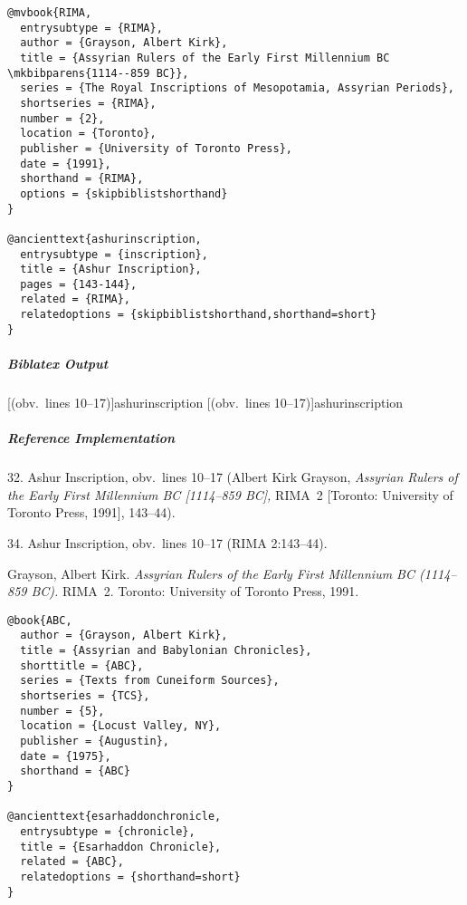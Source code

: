 \documentclass[a4paper]{article}
\newenvironment{biboutput}{%
  \subparagraph{Biblatex Output}
}{\color{black}}
\newenvironment{refimp}{%
  \subparagraph{Reference Implementation}
  \color{reference-colour}
  \rm
}{\par\color{black}}
\begin{document}
\medskip

\begin{lstlisting}
@mvbook{RIMA,
  entrysubtype = {RIMA},
  author = {Grayson, Albert Kirk},
  title = {Assyrian Rulers of the Early First Millennium BC \mkbibparens{1114--859 BC}},
  series = {The Royal Inscriptions of Mesopotamia, Assyrian Periods},
  shortseries = {RIMA},
  number = {2},
  location = {Toronto},
  publisher = {University of Toronto Press},
  date = {1991},
  shorthand = {RIMA},
  options = {skipbiblistshorthand}
}

@ancienttext{ashurinscription,
  entrysubtype = {inscription},
  title = {Ashur Inscription},
  pages = {143-144},
  related = {RIMA},
  relatedoptions = {skipbiblistshorthand,shorthand=short}
}
\end{lstlisting}

\begin{biboutput}
  [(obv.\ lines 10--17)]{ashurinscription}
  [(obv.\ lines 10--17)]{ashurinscription}
\end{biboutput}

\begin{refimp}
  \hspace*{\bibindent}32. Ashur Inscription, obv.\ lines 10–17 (Albert Kirk
  Grayson, \emph{Assyrian Rulers of the Early First Millennium BC [1114–859
  BC],} RIMA~2 [Toronto: University of Toronto Press, 1991], 143–44).

  \hspace*{\bibindent}34. Ashur Inscription, obv.\ lines 10–17 (RIMA
  2:143–44).

  \hangindent\bibindent Grayson, Albert Kirk. \emph{Assyrian Rulers of the
  Early First Millennium BC (1114–859 BC).} RIMA~2. Toronto: University of
  Toronto Press, 1991.

\end{refimp}

\medskip

\begin{lstlisting}
@book{ABC,
  author = {Grayson, Albert Kirk},
  title = {Assyrian and Babylonian Chronicles},
  shorttitle = {ABC},
  series = {Texts from Cuneiform Sources},
  shortseries = {TCS},
  number = {5},
  location = {Locust Valley, NY},
  publisher = {Augustin},
  date = {1975},
  shorthand = {ABC}
}

@ancienttext{esarhaddonchronicle,
  entrysubtype = {chronicle},
  title = {Esarhaddon Chronicle},
  related = {ABC},
  relatedoptions = {shorthand=short}
}
\end{lstlisting}
\end{document}
